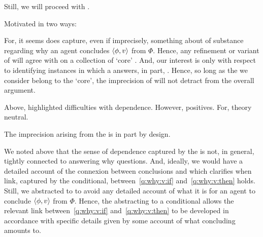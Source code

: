 \begin{note}
  Still, we will proceed with \qWhyV{}.

  Motivated in two ways:
\end{note}

\begin{note}[Way A]
  For, it seems \qWhyV{} does capture, even if imprecisely, something about of substance regarding why an agent concludes \(\langle \phi, v \rangle\) from \(\Phi\).
  Hence, any refinement or variant of \qWhyV{} will agree with \qWhyV{} on a collection of `core' .
  And, our interest is only with respect to identifying instances in which a \ros{} answers, in part, \qWhyV{}.
  Hence, so long as the  we consider belong to the `core', the imprecision of \qWhyV{} will not detract from the overall argument.
\end{note}

\begin{note}[Way B]
  Above, highlighted difficulties with dependence.
  However, positives.
  For, theory neutral.

  The imprecision arising from the \qWVitc{} is in part by design.

  We noted above that the sense of dependence captured by the \qWVitc{} is not, in general, tightly connected to answering why questions.
  And, ideally, we would have a detailed account of the connexion between conclusions and  which clarifies when link, captured by the conditional, between~\ref{q:why:v:if} and~\ref{q:why:v:then} holds.
  Still, we abstracted to  to avoid any detailed account of what it is for an agent to conclude \(\langle \phi, v \rangle\) from \(\Phi\).
  Hence, the abstracting to a conditional allows the relevant link between~\ref{q:why:v:if} and~\ref{q:why:v:then} to be developed in accordance with specific details given by some account of what concluding amounts to.
\end{note}


\subsection{\qHowV{}}
\label{cha:var:sec:vars:qhowv}

